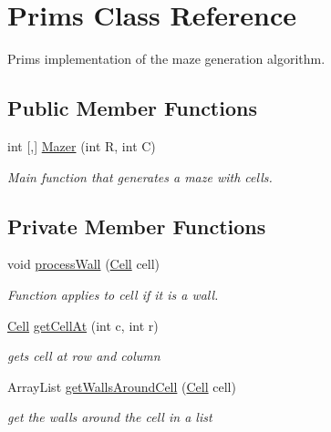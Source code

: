 \hypertarget{class_prims}{}\section{Prims Class Reference}
\label{class_prims}


Prim\textquotesingle{}s implementation of the maze generation algorithm.  


\subsection*{Public Member Functions}
\begin{DoxyCompactItemize}
\item 
int \mbox{[},\mbox{]} \mbox{\hyperlink{class_prims_a91fe81277dd1390c13955bd5f338cd86}{Mazer}} (int R, int C)
\begin{DoxyCompactList}\small\item\em Main function that generates a maze with cells. \end{DoxyCompactList}\end{DoxyCompactItemize}
\subsection*{Private Member Functions}
\begin{DoxyCompactItemize}
\item 
void \mbox{\hyperlink{class_prims_a72d5c6fce801461c3dc9a6a9e4f117f3}{process\+Wall}} (\mbox{\hyperlink{class_cell}{Cell}} cell)
\begin{DoxyCompactList}\small\item\em Function applies to cell if it is a wall. \end{DoxyCompactList}\item 
\mbox{\hyperlink{class_cell}{Cell}} \mbox{\hyperlink{class_prims_a728350565172ad086c4fa5b8a453e419}{get\+Cell\+At}} (int c, int r)
\begin{DoxyCompactList}\small\item\em gets cell at row and column \end{DoxyCompactList}\item 
Array\+List \mbox{\hyperlink{class_prims_af79c48f9584fc1e8e37cf0ef5edd904e}{get\+Walls\+Around\+Cell}} (\mbox{\hyperlink{class_cell}{Cell}} cell)
\begin{DoxyCompactList}\small\item\em get the walls around the cell in a list \end{DoxyCompactList}\end{DoxyCompactItemize}
